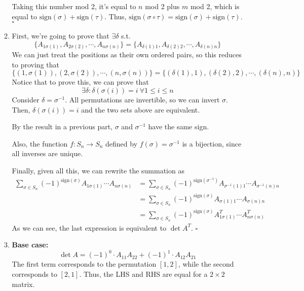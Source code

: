\documentclass[12pt]{article}
\begin{document}
\begin{enumerate}
\begin{enumerate}
                        Taking this number mod 2, it's equal to $n$ mod 2 plus $m$ mod 2, which is equal to $\text{sign}(\sigma)+\text{sign}(\tau)$.
                        Thus, $\text{sign}(\sigma \circ \tau)=\text{sign}(\sigma)+\text{sign}(\tau)$. $\square$
                  \item First, we're going to prove that $\exists \delta$ s.t.
                        \[\{A_{1\sigma(1)}, A_{2\sigma(2)}, \cdots, A_{n\sigma(n)}\}=
                              \{A_{\delta(1)1}, A_{\delta(2)2}, \cdots, A_{\delta(n)n}\}\]
                        We can just treat the positions as their own ordered pairs, so this reduces to proving that
                        \[\{(1, \sigma(1)), (2, \sigma(2)), \cdots, (n, \sigma(n))\}=
                              \{(\delta(1), 1), (\delta(2), 2), \cdots, (\delta(n), n)\}\]
                        Notice that to prove this, we can prove that
                        \[\exists \delta: \delta(\sigma(i))=i\ \forall 1 \le i \le n\]
                        Consider $\delta=\sigma^{-1}$.
                        All permutations are invertible, so we can invert $\sigma$.
                        Then, $\delta(\sigma(i))=i$ and the two sets above are equivalent.

                        By the result in a previous part, $\sigma$ and $\sigma^{-1}$ have the same sign.

                        Also, the function $f: S_n \rightarrow S_n$ defined by $f(\sigma)=\sigma^{-1}$ is a bijection,
                        since all inverses are unique.

                        Finally, given all this, we can rewrite the summation as
                        \begin{align*}
                              \sum_{\sigma \in S_n} (-1)^{\text{sign}(\sigma)} A_{1\sigma(1)} \cdots A_{n\sigma(n)}
                               & = \sum_{\sigma \in S_n} (-1)^{\text{sign}\left(\sigma^{-1}\right)} A_{\sigma^{-1}(1)1} \cdots A_{\sigma^{-1}(n)n} \\
                               & =\sum_{\sigma \in S_n} (-1)^{\text{sign}(\sigma)} A_{\sigma(1)1} \cdots A_{\sigma(n)n}                            \\
                               & =\sum_{\sigma \in S_n} (-1)^{\text{sign}(\sigma)} A^T_{1\sigma(1)} \cdots A^T_{n\sigma(n)}
                        \end{align*}
                        As we can see, the last expression is equivalent to $\det A^T$. $\square$
                  \item \textbf{Base case:}
                        \[\det A=(-1)^0 \cdot A_{11}A_{22}+(-1)^1 \cdot A_{12}A_{21}\]
                        The first term corresponds to the permutation $[1, 2]$, while the second corresponds to $[2, 1]$.
                        Thus, the LHS and RHS are equal for a $2 \times 2$ matrix.


\end{enumerate}
\end{enumerate}
\end{document}
